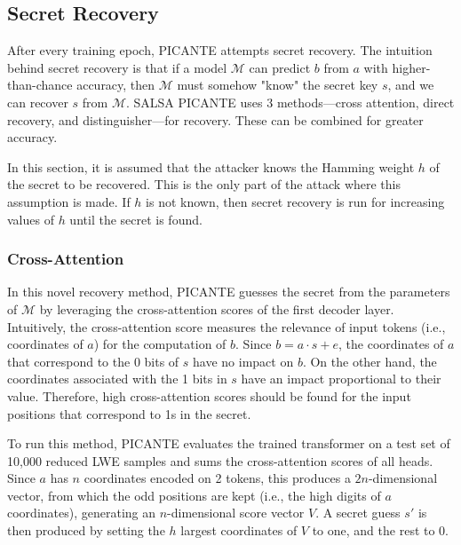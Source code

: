 \documentclass{article}
\begin{document}
\subsection{Secret Recovery}

After every training epoch, PICANTE attempts secret recovery. The intuition behind secret recovery is that if a model \(\mathcal{M}\) can predict \(b\) from \(a\) with higher-than-chance accuracy, then \(\mathcal{M}\) must somehow "know" the secret key \(s\), and we can recover \(s\) from \(\mathcal{M}\). SALSA PICANTE uses 3 methods—cross attention, direct recovery, and distinguisher—for recovery. These can be combined for greater accuracy.

In this section, it is assumed that the attacker knows the Hamming weight \(h\) of the secret to be recovered. This is the only part of the attack where this assumption is made. If \(h\) is not known, then secret recovery is run for increasing values of \(h\) until the secret is found.

\subsubsection{Cross-Attention}
In this novel recovery method, PICANTE guesses the secret from the parameters of \(\mathcal{M}\) by leveraging the cross-attention scores of the first decoder layer. Intuitively, the cross-attention score measures the relevance of input tokens (i.e., coordinates of \(a\)) for the computation of \(b\). Since \(b = a \cdot s + e\), the coordinates of \(a\) that correspond to the 0 bits of \(s\) have no impact on \(b\). On the other hand, the coordinates associated with the 1 bits in \(s\) have an impact proportional to their value. Therefore, high cross-attention scores should be found for the input positions that correspond to 1s in the secret.

To run this method, PICANTE evaluates the trained transformer on a test set of 10,000 reduced LWE samples and sums the cross-attention scores of all heads. Since \(a\) has \(n\) coordinates encoded on 2 tokens, this produces a \(2n\)-dimensional vector, from which the odd positions are kept (i.e., the high digits of \(a\) coordinates), generating an \(n\)-dimensional score vector \(V\). A secret guess \(s'\) is then produced by setting the \(h\) largest coordinates of \(V\) to one, and the rest to 0.
\end{document}
